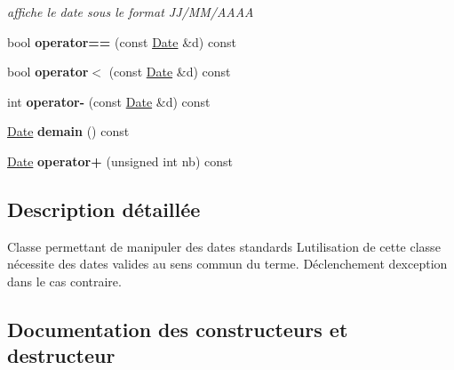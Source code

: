 \begin{DoxyCompactItemize}
\begin{DoxyCompactList}\small\item\em affiche le date sous le format J\+J/\+M\+M/\+A\+A\+A\+A \end{DoxyCompactList}\item 
\hypertarget{class_t_i_m_e_1_1_date_aa8208298c0efe5dbf661c66a284fd163}{}bool {\bfseries operator==} (const \hyperlink{class_t_i_m_e_1_1_date}{Date} \&d) const \label{class_t_i_m_e_1_1_date_aa8208298c0efe5dbf661c66a284fd163}

\item 
\hypertarget{class_t_i_m_e_1_1_date_a8a3bccb05f00086e64c5b5518a37949f}{}bool {\bfseries operator$<$} (const \hyperlink{class_t_i_m_e_1_1_date}{Date} \&d) const \label{class_t_i_m_e_1_1_date_a8a3bccb05f00086e64c5b5518a37949f}

\item 
\hypertarget{class_t_i_m_e_1_1_date_a61f93f8612a998bc440070f9b8a2660a}{}int {\bfseries operator-\/} (const \hyperlink{class_t_i_m_e_1_1_date}{Date} \&d) const \label{class_t_i_m_e_1_1_date_a61f93f8612a998bc440070f9b8a2660a}

\item 
\hypertarget{class_t_i_m_e_1_1_date_a85907da4cadaff930c748328fda4d527}{}\hyperlink{class_t_i_m_e_1_1_date}{Date} {\bfseries demain} () const \label{class_t_i_m_e_1_1_date_a85907da4cadaff930c748328fda4d527}

\item 
\hypertarget{class_t_i_m_e_1_1_date_a3c1f346c2ad9287155a71dc5d09e7fd8}{}\hyperlink{class_t_i_m_e_1_1_date}{Date} {\bfseries operator+} (unsigned int nb) const \label{class_t_i_m_e_1_1_date_a3c1f346c2ad9287155a71dc5d09e7fd8}

\end{DoxyCompactItemize}


\subsection{Description détaillée}
Classe permettant de manipuler des dates standards L\textquotesingle{}utilisation de cette classe nécessite des dates valides au sens commun du terme. Déclenchement d\textquotesingle{}exception dans le cas contraire. 

\subsection{Documentation des constructeurs et destructeur}
\hypertarget{class_t_i_m_e_1_1_date_ab0d72ce6e986c0c0a5f2902e586cf81a}{}
